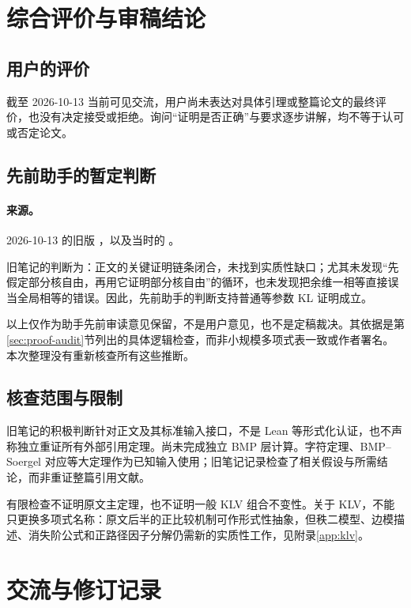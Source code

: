 \section{综合评价与审稿结论}\label{sec:assessment}

\subsection{用户的评价}
截至 2026-10-13 当前可见交流，用户尚未表达对具体引理或整篇论文的最终评价，也没有决定接受或拒绝。询问“证明是否正确”与要求逐步讲解，均不等于认可或否定论文。

\subsection{先前助手的暂定判断}
\paragraph{来源。}2026-10-13 的旧版 ，以及当时的 。

旧笔记的判断为：正文的关键证明链条闭合，未找到实质性缺口；尤其未发现“先假定部分核自由，再用它证明部分核自由”的循环，也未发现把余维一相等直接误当全局相等的错误。因此，先前助手的判断支持普通等参数 KL 证明成立。

以上仅作为助手先前审读意见保留，不是用户意见，也不是定稿裁决。其依据是第\ref{sec:proof-audit}节列出的具体逻辑检查，而非小规模多项式表一致或作者署名。本次整理没有重新核查所有这些推断。

\subsection{核查范围与限制}
旧笔记的积极判断针对正文及其标准输入接口，不是 Lean 等形式化认证，也不声称独立重证所有外部引用定理。尚未完成独立 BMP 层计算。字符定理、BMP--Soergel 对应等大定理作为已知输入使用；旧笔记记录检查了相关假设与所需结论，而非重证整篇引用文献。

有限检查不证明原文主定理，也不证明一般 KLV 组合不变性。关于 KLV，不能只更换多项式名称：原文后半的正比较机制可作形式性抽象，但秩二模型、边模描述、消失阶公式和正路径因子分解仍需新的实质性工作，见附录\ref{app:klv}。

\section{交流与修订记录}\label{sec:history}

